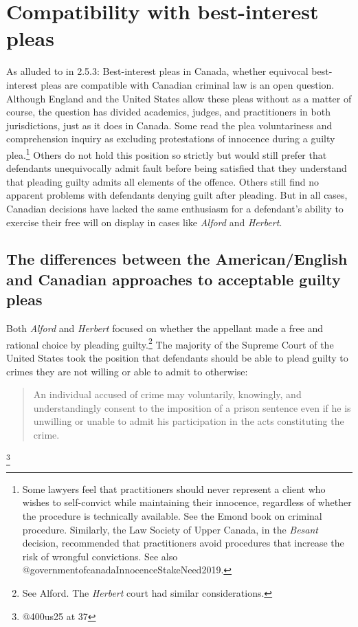 \section{Compatibility with best-interest pleas}

As alluded to in 2.5.3: Best-interest pleas in Canada, whether equivocal best-interest pleas are compatible with Canadian criminal law is an open question. Although England and the United States allow these pleas without as a matter of course, the question has divided academics, judges, and practitioners in both jurisdictions, just as it does in Canada. Some read the plea voluntariness and comprehension inquiry as excluding protestations of innocence during a guilty plea.\footnote{Some lawyers feel that practitioners should never represent a client who wishes to self-convict while maintaining their innocence, regardless of whether the procedure is technically available. See the Emond book on criminal procedure. Similarly, the Law Society of Upper Canada, in the \textit{Besant} decision, recommended that practitioners avoid procedures that increase the risk of wrongful convictions. See also @governmentofcanadaInnocenceStakeNeed2019.} Others do not hold this position so strictly but would still prefer that defendants unequivocally admit fault before being satisfied that they understand that pleading guilty admits all elements of the offence. Others still find no apparent problems with defendants denying guilt after pleading. But in all cases, Canadian decisions have lacked the same enthusiasm for a defendant's ability to exercise their free will on display in cases like \textit{Alford} and \textit{Herbert}. 

\subsection{The differences between the American/English and Canadian approaches to acceptable guilty pleas}

Both \textit{Alford} and \textit{Herbert} focused on whether the appellant made a free and rational choice by pleading guilty.\footnote{See Alford. The \textit{Herbert} court had similar considerations.} The majority of the Supreme Court of the United States took the position that defendants should be able to plead guilty to crimes they are not willing or able to admit to otherwise:

\begin{quote}
    An individual accused of crime may voluntarily, knowingly, and understandingly consent to the imposition of a prison sentence even if he is unwilling or unable to admit his participation in the acts constituting the crime.
\end{quote}\footnote{@400us25 at 37}

